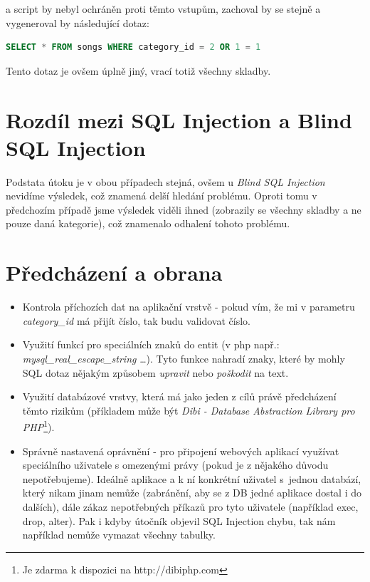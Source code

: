 a script by nebyl ochráněn proti těmto  vstupům, zachoval by se stejně a vygeneroval by následující dotaz:
\begin{lstlisting}[label=web_app_url_4,language=SQL, caption=Vygenerovaný SQL dotaz z upraveného URL]
SELECT * FROM songs WHERE category_id = 2 OR 1 = 1
\end{lstlisting}

Tento dotaz je ovšem úplně jiný, vrací totiž všechny skladby.

\section{Rozdíl mezi SQL Injection a Blind SQL Injection}
Podstata útoku je v obou případech stejná, ovšem u \textit{Blind SQL Injection} nevidíme výsledek, což znamená delší hledání problému. Oproti tomu v předchozím případě jsme výsledek viděli ihned (zobrazily se všechny skladby a ne pouze daná kategorie), což znamenalo odhalení tohoto problému. 

\section{Předcházení a obrana}
\begin{itemize}
\item Kontrola příchozích dat na aplikační vrstvě - pokud vím, že mi v parametru \textit{category\_id} má přijít číslo, tak budu validovat číslo.
\item Využití funkcí pro  speciálních znaků do entit (v php např.: \textit{mysql\_real\_escape\_string} \ldots). Tyto funkce nahradí znaky, které by mohly SQL dotaz nějakým způsobem \textit{upravit} nebo \textit{poškodit} na text.
\item Využití databázové vrstvy, která má jako jeden z cílů právě předcházení těmto rizikům (příkladem může být \textit{Dibi - Database Abstraction Library pro PHP}\footnote{Je zdarma k dispozici na http://dibiphp.com}).
\item Správně nastavená oprávnění - pro připojení webových aplikací využívat speciálního uživatele s omezenými právy (pokud je z nějakého důvodu nepotřebujeme). Ideálně aplikace a k ní konkrétní uživatel s~jednou databází, který nikam jinam nemůže (zabránění, aby se z DB jedné aplikace dostal i do dalších), dále zákaz nepotřebných příkazů pro tyto uživatele (například exec, drop, alter). Pak i kdyby útočník objevil SQL Injection chybu, tak nám například nemůže vymazat všechny tabulky.
\end{itemize}

